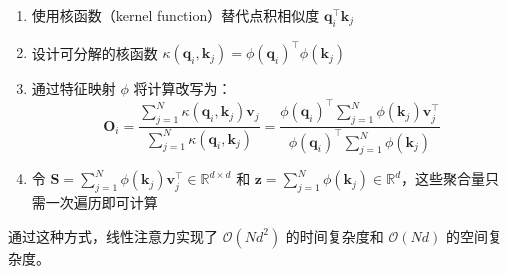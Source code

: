 \begin{enumerate}
    \item 使用核函数（kernel function）替代点积相似度 $\mathbf{q}_i^\top \mathbf{k}_j$
    \item 设计可分解的核函数 $\kappa(\mathbf{q}_i, \mathbf{k}_j) = \phi(\mathbf{q}_i)^\top \phi(\mathbf{k}_j)$
    \item 通过特征映射 $\phi$ 将计算改写为：
    \begin{equation}
        \mathbf{O}_i = \frac{\sum_{j=1}^N \kappa(\mathbf{q}_i, \mathbf{k}_j)\mathbf{v}_j}{\sum_{j=1}^N \kappa(\mathbf{q}_i, \mathbf{k}_j)} = \frac{\phi(\mathbf{q}_i)^\top \sum_{j=1}^N \phi(\mathbf{k}_j)\mathbf{v}_j^\top}{\phi(\mathbf{q}_i)^\top \sum_{j=1}^N \phi(\mathbf{k}_j)}
    \end{equation}
    \item 令 $\mathbf{S} = \sum_{j=1}^N \phi(\mathbf{k}_j)\mathbf{v}_j^\top \in \mathbb{R}^{d \times d}$ 和 $\mathbf{z} = \sum_{j=1}^N \phi(\mathbf{k}_j) \in \mathbb{R}^d$，这些聚合量只需一次遍历即可计算
\end{enumerate}

通过这种方式，线性注意力实现了 $\mathcal{O}(Nd^2)$ 的时间复杂度和 $\mathcal{O}(Nd)$ 的空间复杂度。
